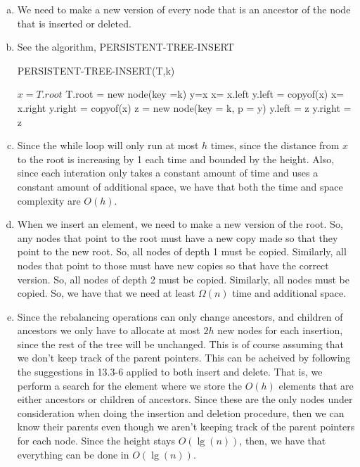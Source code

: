 \documentclass{article}
\begin{document}
\begin{enumerate}[a.]
\item
We need to make a new version of every node that is an ancestor of the node that is inserted or deleted.

\item
See the algorithm, PERSISTENT-TREE-INSERT

\begin{algorithm}
\caption{PERSISTENT-TREE-INSERT(T,k)}
\begin{algorithmic}
\State $x = T.root$
\State T.root = new node(key =k)
\EndIf
{}
\State y=x
\State x=  x.left
\State y.left = copyof(x)
\Else
\State x= x.right
\State y.right = copyof(x)
\EndIf
\EndWhile
\State z = new node(key = k, p = y)
\State y.left = z
\Else
\State y.right = z
\EndIf
\end{algorithmic}
\end{algorithm}

\item
Since the while loop will only run at most $h$ times, since the distance from $x$ to the root is increasing by 1 each time and bounded by the height. Also, since each interation only takes a constant amount of time and uses a constant amount of additional space, we have that both the time and space complexity are $O(h)$.


\item
When we insert an element, we need to make a new version of the root. So, any nodes that point to the root must have a new copy made so that they point to the new root. So, all nodes of depth 1 must be copied. Similarly, all nodes that point to those must have new copies so that have the correct version. So, all nodes of depth 2 must be copied. Similarly, all nodes must be copied. So, we have that we need at least $\Omega(n)$ time and additional space.

\item
Since the rebalancing operations can only change ancestors, and children of ancestors we only have to allocate at most $2h$ new nodes for each insertion, since the rest of the tree will be unchanged. This is of course assuming that we don't keep track of the parent pointers. This can be acheived by following the suggestions in 13.3-6 applied to both insert and delete. That is, we perform a search for the element where we store the $O(h)$ elements that are either ancestors or children of ancestors. Since these are the only nodes under consideration when doing the insertion and deletion procedure, then we can know their parents even though we aren't keeping track of the parent pointers for each node. Since the height stays $O(\lg(n))$, then, we have that everything can be done in $O(\lg(n))$.


\end{enumerate}
\end{document}
